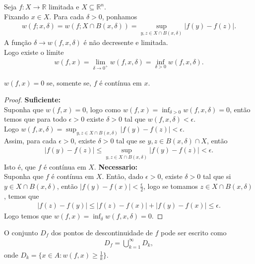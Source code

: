 \begin{definition}
  Seja $f:X\to\mathbb{R}$ limitada e $X\subseteq\mathbb{R}^{n}$.\\
  Fixando $x\in X$. Para cada $\delta>0$, ponhamos
  \begin{align*}
    w(f;x,\delta)=w(f;X\cap B(x,\delta))=\sup_{y,z\in X\cap B(x,\delta)}|f(y)-f(z)|.
  \end{align*}
  A função $\delta\to w(f,x,\delta)$ é não decresente e limitada.\\
  Logo existe o límite
  \begin{align*}
    w(f,x)=\lim_{\delta \to 0^{+}}w(f,x,\delta)=\inf_{\delta>0}w(f,x,\delta).
  \end{align*}
\end{definition}
\begin{proposition}
  $w(f,x)=0$ se, somente se, $f$ é contínua em $x$. 
\end{proposition}
\begin{proof} 
\textbf{Suficiente:}\\
  Suponha que $w(f,x)=0$, logo como $w(f,x)=\inf_{\delta>0}w(f,x,\delta)=0$, então temos que para todo $\epsilon>0$ existe $\delta>0$ tal que $w(f,x,\delta)<\epsilon$.\\
  Logo $w(f,x,\delta)=\sup_{y,z\in X\cap B(x,\delta)}|f(y)-f(z)|<\epsilon$.\\
  Assim, para cada $\epsilon>0$, existe $\delta>0$ tal que se $y,z\in B(x,\delta)\cap X$, então
  \begin{align*}
    |f(y)-f(z)|\leq\sup_{y,z\in X\cap B(x,\delta)}|f(y)-f(z)|<\epsilon.
  \end{align*}
  Isto é, que $f$ é contínua em $X$.
\textbf{Necessario:}\\
  Suponha que $f$ é contínua em $X$. Então, dado $\epsilon>0$, existe $\delta>0$ tal que si $y\in X\cap B(x,\delta)$, então
  $|f(y)-f(x)|<\frac{\epsilon}{2}$, logo se tomamos $z\in X\cap B(x,\delta)$, temos que
  \begin{align*}
    |f(z)-f(y)|\leq |f(z)-f(x)|+|f(y)-f(x)|\leq \epsilon.
  \end{align*}
  Logo temos que $w(f,x)=\inf_{\delta}w(f,x,\delta)=0$.
\end{proof} 
\begin{proposition}
  O conjunto $D_f$ dos pontos de descontinuidade de $f$ pode ser escrito como
  \begin{align*}
    D_f=\bigcup_{k=1}^{\infty}D_k,
  \end{align*}
  onde $D_k=\{x\in A:w(f,x)\geq \frac{1}{k}\}$.
\end{proposition}
